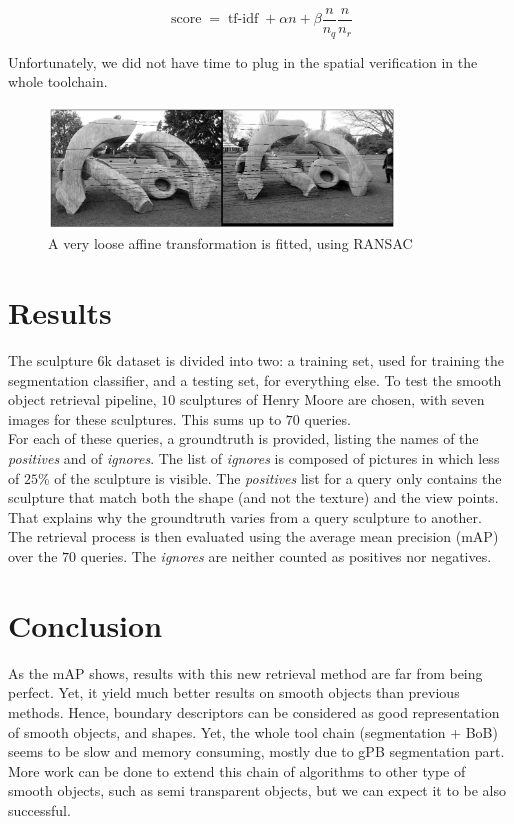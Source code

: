 \documentclass{article}
\DeclareMathOperator{\score}{score}
\DeclareMathOperator{\tfidf}{tf-idf}
\begin{document}
\begin{equation*}
\score = \tfidf + \alpha n + \beta \frac{n}{n_q} \frac{n}{n_r}
\end{equation*}

Unfortunately, we did not have time to plug in the spatial verification in the
whole toolchain.

\begin{figure}
\label{ransac}
\begin{center}
\includegraphics[width=350px]{images/matching_01.png}
\end{center}
\caption{A very loose affine transformation is fitted, using RANSAC}
\end{figure}

\section{Results}

The sculpture 6k dataset is divided into two: a training set, used for
training the segmentation classifier, and a testing set, for everything else.
To test the smooth object retrieval pipeline, $10$ sculptures of Henry Moore are
chosen, with seven images for these sculptures. This sums up to $70$ queries. \\
For each of these queries, a groundtruth is provided, listing the names of the
\textit{positives} and of \textit{ignores}. The list of \textit{ignores} is
composed of pictures in which less of $25$\% of the sculpture is visible. The
\textit{positives} list for a query only contains the sculpture that match
both the shape (and not the texture) and the view points. That explains why
the groundtruth varies from a query sculpture to another. \\
The retrieval process is then evaluated using the average mean precision (mAP)
over the $70$ queries. The \textit{ignores} are neither counted as positives nor
negatives.


\section{Conclusion}

As the mAP shows, results with this new retrieval method are far from being
perfect. Yet, it yield much better results on smooth objects than previous
methods. Hence, boundary descriptors can be considered as good representation
of smooth objects, and shapes. Yet, the whole tool chain (segmentation + BoB)
seems to be slow and memory consuming, mostly due to gPB segmentation part. \\
More work can be done to extend this chain of algorithms to other type of
smooth objects, such as semi transparent objects, but we can expect it to be
also successful. \\



\end{document}
